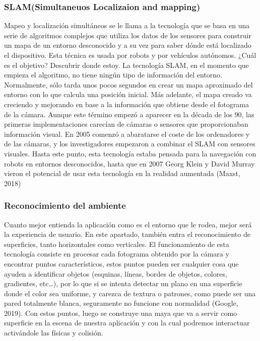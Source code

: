 \subsubsection{SLAM(Simultaneuos Localizaion and mapping)}
Mapeo y localización simultáneos se le llama a la tecnología que se basa en una serie de algoritmos complejos que utiliza los datos de los sensores para construir un mapa de un entorno desconocido y a su vez para saber dónde está localizado el dispositivo. Esta técnica es usada por robots y por vehículos autónomos. 
¿Cuál es el objetivo? Descubrir donde estoy. La tecnología SLAM, en el momento que empieza el algoritmo, no tiene ningún tipo de información del entorno. Normalmente, sólo tarda unos pocos segundos en crear un mapa aproximado del entorno con lo que calcula una posición inicial. Más adelante, el mapa creado va creciendo y mejorando en base a la información que obtiene desde el fotograma de la cámara.
Aunque este término empezó a aparecer en la década de los 90, las primeras implementaciones carecían de cámaras o sensores que proporcionaban información visual. En 2005 comenzó a abaratarse el coste de los ordenadores y de las cámaras, y los investigadores empezaron a combinar el SLAM con sensores visuales. Hasta este punto, esta tecnología estaba pensada para la navegación con robots en entornos desconocidos, hasta que en 2007 Georg Klein y David Murray vieron el potencial de usar esta tecnología en la realidad aumentada
(Maxst, 2018)
\subsubsection{Reconocimiento del ambiente}
Cuanto mejor entienda la aplicación como es el entorno que le rodea, mejor será la experiencia de usuario. En este apartado, también entra el reconocimiento de superficies, tanto horizontales como verticales. El funcionamiento de esta tecnología consiste en procesar cada fotograma obtenido por la cámara y encontrar puntos característicos, estos puntos pueden ser cualquier cosa que ayuden a identificar objetos (esquinas, líneas, bordes de objetos, colores, gradientes, etc…), por lo que si se intenta detectar un plano en una superficie donde el color sea uniforme, y carezca de textura o patrones, como puede ser una pared totalmente blanca, seguramente no funcione con normalidad (Google, 2019). Con estos puntos, luego se construye una maya que va a servir como superficie en la escena de nuestra aplicación y con la cual podremos interactuar activándole las físicas y colisión.
